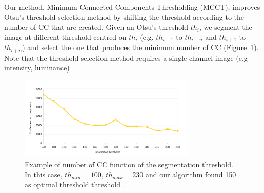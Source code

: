 Our method, Minimum Connected Components Thresholding (MCCT), improves Otsu's threshold selection method by shifting the threshold according to the number of CC that are created.
Given an Otsu's threshold $th_i$, we segment the image at different threshold centred on $th_i$ (e.g. $th_{i-1}$ to $th_{i-n}$ and $th_{i+1}$ to $th_{i+n}$) and select the one that produces the minimum number of CC (Figure~\ref{fig:in:CC_graph}).
Note that the threshold selection method requires a single channel image (e.g intensity, luminance) %


% 
	\begin{figure}[h!]	%
	  \centering
		\includegraphics[trim= 0px 0px 0px 0px, clip, width=0.75\textwidth]{CC_graph_source_one_curve.pdf}
		\caption[Evolution of the number of connected-component]{Example of number of CC function of the segmentation threshold. In this case, $th_{min}=100$, $th_{max}=230$ and our algorithm found 150 as optimal threshold threshold .}
		\label{fig:in:CC_graph}
	\end{figure}

